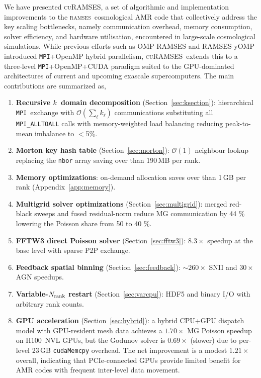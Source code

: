 \documentclass[fleqn,usenatbib]{mnras}
\newcommand{\ramses}{\textsc{ramses}}
\newcommand{\curamses}{\textsc{cuRAMSES}}
\newcommand{\nrank}{N_{\rm rank}}
\newcommand{\ksec}{\ensuremath{k}\text{-section}}
\newcommand{\Olog}[1]{\mathcal{O}(#1)}
\newcommand{\code}[1]{\texttt{#1}}
\newcommand{\mpi}[0]{\texttt{MPI}}
\begin{document}
We have presented \curamses, a set of algorithmic and implementation
improvements to the \ramses\ cosmological AMR code that collectively
address the key scaling bottlenecks, namely communication overhead, memory
consumption, solver efficiency, and hardware utilisation, encountered
in large-scale cosmological simulations. While previous efforts such as
OMP-RAMSES \citep{Lee2021} and RAMSES-yOMP \citep{Han2026} introduced
\mpi+OpenMP hybrid parallelism, \curamses\ extends this to a three-level
\mpi+OpenMP+CUDA paradigm suited to the GPU-dominated architectures of
current and upcoming exascale supercomputers. The main contributions
are summarized as,
\begin{enumerate}
\item \textbf{Recursive \ksec\ domain decomposition}
  (Section~\ref{sec:ksection}): hierarchical \mpi\ exchange with
  $\Olog{\sum_\ell k_\ell}$ communications substituting all \code{MPI\_ALLTOALL}
  calls with memory-weighted load balancing reducing peak-to-mean
  imbalance to $<$5\%.

\item \textbf{Morton key hash table} (Section~\ref{sec:morton}):
  $\Olog{1}$ neighbour lookup replacing the \code{nbor} array saving over than 190\,MB per rank.

\item \textbf{Memory optimizations}: on-demand allocation saves
  over than 1\,GB per rank (Appendix~\ref{app:memory}).

\item \textbf{Multigrid solver optimizations}
  (Section~\ref{sec:multigrid}): merged red-black sweeps and fused
  residual-norm reduce MG communication by 44 \% lowering
  the Poisson share from 50 to 40 \%.

\item \textbf{FFTW3 direct Poisson solver} (Section~\ref{sec:fftw3}):
  $8.3\times$ speedup at the base level with sparse P2P exchange.

\item \textbf{Feedback spatial binning} (Section~\ref{sec:feedback}):
  ${\sim}260\times$ SNII and $30\times$ AGN speedups.

\item \textbf{Variable-$\nrank$ restart} (Section~\ref{sec:varcpu}):
  HDF5 and binary I/O with arbitrary rank counts.

\item \textbf{GPU acceleration} (Section~\ref{sec:hybrid}):
  a hybrid CPU+GPU dispatch model with GPU-resident mesh data
  achieves a $1.70\times$ MG Poisson speedup on H100~NVL GPUs,
  but the Godunov solver is $0.69\times$ (slower) due to per-level
  23\,GB \code{cudaMemcpy} overhead.  The net improvement is a
  modest $1.21\times$ overall, indicating that PCIe-connected GPUs
  provide limited benefit for AMR codes with frequent inter-level
  data movement.
\end{enumerate}
\end{document}
